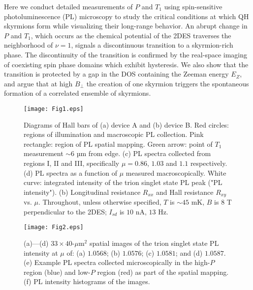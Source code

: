 \documentclass
[aps,prl,twocolumn,superscriptaddress,showpacs,floatfix]{revtex4-1}%
\begin{document}
Here we conduct detailed measurements of $P$ and $T_1$ using spin-sensitive photoluminescence (PL) microscopy to study the critical conditions at which QH skyrmions form while visualizing their long-range behavior. An abrupt change in $P$ and $T_1$, which occurs as the chemical potential of the 2DES traverses the neighborhood of $\nu=1$, signals a discontinuous transition to a skyrmion-rich phase. The discontinuity of the transition is confirmed by the real-space imaging of coexisting spin phase domains which exhibit hysteresis. We also show that the transition is protected by a gap in the DOS containing the Zeeman energy $E_Z$, and argue that at high $B_{\perp}$ the creation of one skyrmion triggers the spontaneous formation of a correlated ensemble of skyrmions.
\begin{figure}[b]
	\par
	\begin{center}
		\texttt{[image: Fig1.eps]}
	\end{center}
	\caption{Diagrams of Hall bars of (a) device A and (b) device B. Red circles: regions of illumination and macroscopic PL collection. Pink rectangle: region of PL spatial mapping. Green arrow: point of $T_1$ measurement ${\sim}6$ µm from edge. (c) PL spectra collected from regions I, II and III, specifically $\mu=0.86$, $1.03$ and $1.1$ respectively. (d)	PL spectra as a function of $\mu$ measured macroscopically. White curve: integrated intensity of the trion singlet state PL peak ("PL intensity"). (b) Longitudinal resistance $R_{xx}$ and Hall resistance $R_{xy}$ vs. $\mu$. Throughout, unless otherwise specified,  $T$ is ${\sim}45$ mK, $B$ is $8$ T perpendicular to the 2DES; $I_{sd}$ is $10$ nA, $13$ Hz.}%
	\label{fig:fig1}%
\end{figure}
\begin{figure*}[t]
	\par
	\begin{center}
		\texttt{[image: Fig2.eps]}
	\end{center}
	\caption{(a)---(d) $33\times40$-$\mu$m$^{2}$ spatial images of the trion singlet state PL intensity at $\mu$ of: (a) $1.0568$; (b) $1.0576$; (c) $1.0581$; and (d) $1.0587$. (e) Example PL spectra collected microscopically in the high-$P$ region (blue) and low-$P$ region (red) as part of the spatial mapping. (f) PL intensity histograms of the images.}%
	\label{fig:fig2}%
\end{figure*}
\end{document}
